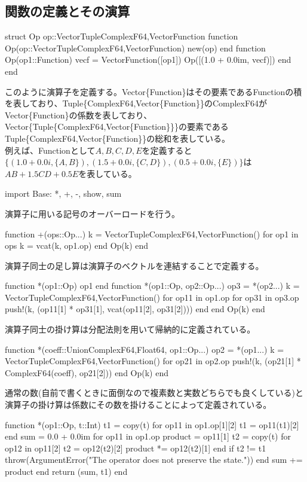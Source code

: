 \documentclass{ltjsarticle}
\begin{document}
\subsection*{関数の定義とその演算}
\begin{jllisting}
struct Op
  op::Vector{Tuple{ComplexF64,Vector{Function}}}
  function Op(op::Vector{Tuple{ComplexF64,Vector{Function}}})
    new(op)
  end
  function Op(op1::Function)
    vecf = Vector{Function}([op1])
    Op([(1.0 + 0.0im, vecf)])
  end
end 
\end{jllisting}
このように演算子を定義する。Vector\{Function\}はその要素であるFunctionの積を表しており、Tuple\{ComplexF64,Vector\{Function\}\}のComplexF64がVector\{Function\}の係数を表しており、Vector\{Tuple\{ComplexF64,Vector\{Function\}\}\}の要素であるTuple\{ComplexF64,Vector\{Function\}\}の総和を表している。\\
例えば、Functionとして$A,B,C,D,E$を定義すると
$\{(1.0+0.0i,\{A,B\}),(1.5+0.0i,\{C,D\}),(0.5+0.0i,\{E\})\}$は$AB+1.5CD+0.5E$を表している。
\begin{jllisting}
import Base: *, +, -, show, sum
\end{jllisting}
演算子に用いる記号のオーバーロードを行う。
\begin{jllisting}
function +(ops::Op...)
  k = Vector{Tuple{ComplexF64,Vector{Function}}}()
  for op1 in ops
    k = vcat(k, op1.op)
  end
  Op(k)
end
\end{jllisting}
演算子同士の足し算は演算子のベクトルを連結することで定義する。
\begin{jllisting}
function *(op1::Op)
  op1
end
function *(op1::Op, op2::Op...)
  op3 = *(op2...)
  k = Vector{Tuple{ComplexF64,Vector{Function}}}()
  for op11 in op1.op
    for op31 in op3.op
      push!(k, (op11[1] * op31[1], vcat(op11[2], op31[2])))
    end
  end
  Op(k)
end
\end{jllisting}
演算子同士の掛け算は分配法則を用いて帰納的に定義されている。
\begin{jllisting}
function *(coeff::Union{ComplexF64,Float64}, op1::Op...)
  op2 = *(op1...)
  k = Vector{Tuple{ComplexF64,Vector{Function}}}()
  for op21 in op2.op
    push!(k, (op21[1] * ComplexF64(coeff), op21[2]))
  end
  Op(k)
end
\end{jllisting}
通常の数(自前で書くときに面倒なので複素数と実数どちらでも良くしている)と演算子の掛け算は係数にその数を掛けることによって定義されている。\\
\begin{jllisting}
function *(op1::Op, t::Int)
  t1 = copy(t)
  for op11 in op1.op[1][2]
    t1 = op11(t1)[2]
  end
  sum = 0.0 + 0.0im
  for op11 in op1.op
    product = op11[1]
    t2 = copy(t)
    for op12 in op11[2]
      t2 = op12(t2)[2]
      product *= op12(t2)[1]
    end
    if t2 != t1
      throw(ArgumentError("The operator does not preserve the state."))
    end
    sum += product
  end
  return (sum, t1)
end
\end{jllisting}
\end{document}
